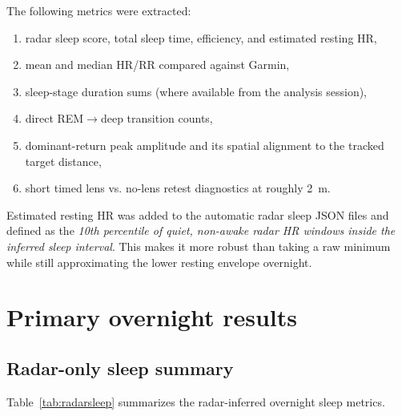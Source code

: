 \documentclass[11pt,a4paper]{article}
\begin{document}
The following metrics were extracted:
\begin{enumerate}
    \item radar sleep score, total sleep time, efficiency, and estimated resting HR,
    \item mean and median HR/RR compared against Garmin,
    \item sleep-stage duration sums (where available from the analysis session),
    \item direct REM$\rightarrow$deep transition counts,
    \item dominant-return peak amplitude and its spatial alignment to the tracked target distance,
    \item short timed lens vs. no-lens retest diagnostics at roughly \SI{2}{m}.
\end{enumerate}

Estimated resting HR was added to the automatic radar sleep JSON files and defined as the \emph{10th percentile of quiet, non-awake radar HR windows inside the inferred sleep interval}. This makes it more robust than taking a raw minimum while still approximating the lower resting envelope overnight.

\section{Primary overnight results}

\subsection{Radar-only sleep summary}
Table~\ref{tab:radarsleep} summarizes the radar-inferred overnight sleep metrics.

\begin{table}[H]
\centering
\caption{Radar sleep summary from the generated JSON sidecars.}
\label{tab:radarsleep}
\end{table}
\end{document}
